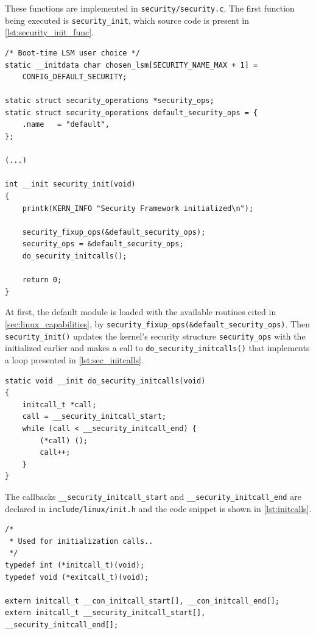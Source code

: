 \noindent
These functions are implemented in \texttt{security/security.c}. The first function being executed is \texttt{security\_init}, which source code is present in \autoref{lst:security_init_func}.

\begin{lstlisting}[frame=none, numbers=none, caption=\texttt{security\_init} function (Linux kernel v3.11), label=lst:security_init_func]
/* Boot-time LSM user choice */
static __initdata char chosen_lsm[SECURITY_NAME_MAX + 1] =
	CONFIG_DEFAULT_SECURITY;

static struct security_operations *security_ops;
static struct security_operations default_security_ops = {
	.name	= "default",
};

(...)

int __init security_init(void)
{
	printk(KERN_INFO "Security Framework initialized\n");

	security_fixup_ops(&default_security_ops);
	security_ops = &default_security_ops;
	do_security_initcalls();

	return 0;
}
\end{lstlisting}

\noindent
At first, the default module is loaded with the available routines cited in \autoref{sec:linux_capabilities}, by \texttt{security\_fixup\_ops(&default\_security\_ops)}. Then \texttt{security\_init()} updates the kernel's security structure \texttt{security\_ops} with the initialized earlier and makes a call to \texttt{do\_security\_initcalls()} that implements a loop presented in \autoref{lst:sec_initcalls}.

\begin{lstlisting}[frame=none, numbers=none, caption=\texttt{do\_security\_initcalls} function (Linux kernel v3.11), label=lst:sec_initcalls]
static void __init do_security_initcalls(void)
{
	initcall_t *call;
	call = __security_initcall_start;
	while (call < __security_initcall_end) {
		(*call) ();
		call++;
	}
}
\end{lstlisting}

\noindent
The callbacks \texttt{\_\_security\_initcall\_start} and \texttt{\_\_security\_initcall\_end} are declared in \texttt{include/linux/init.h} and the code snippet is shown in \autoref{lst:initcalls}.

\begin{lstlisting}[frame=none, numbers=none, caption=\texttt{init} callbacks (Linux kernel v3.11), label=lst:initcalls]
/*
 * Used for initialization calls..
 */
typedef int (*initcall_t)(void);
typedef void (*exitcall_t)(void);

extern initcall_t __con_initcall_start[], __con_initcall_end[];
extern initcall_t __security_initcall_start[], __security_initcall_end[];
\end{lstlisting}

